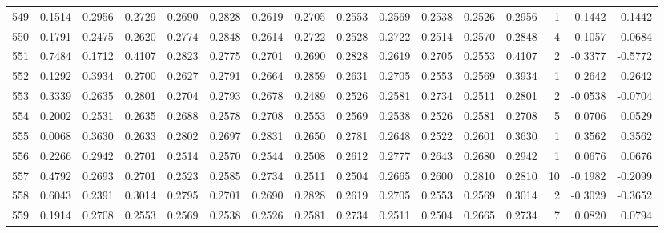 \begin{tabular}{lrrrrrrrrrrrrrrr}
549 &      0.1514 &  0.2956 &  0.2729 &  0.2690 &  0.2828 &  0.2619 &  0.2705 &  0.2553 &  0.2569 &  0.2538 &   0.2526 &     0.2956 &      1 &                    0.1442 &                     0.1442 \\
550 &      0.1791 &  0.2475 &  0.2620 &  0.2774 &  0.2848 &  0.2614 &  0.2722 &  0.2528 &  0.2722 &  0.2514 &   0.2570 &     0.2848 &      4 &                    0.1057 &                     0.0684 \\
551 &      0.7484 &  0.1712 &  0.4107 &  0.2823 &  0.2775 &  0.2701 &  0.2690 &  0.2828 &  0.2619 &  0.2705 &   0.2553 &     0.4107 &      2 &                   -0.3377 &                    -0.5772 \\
552 &      0.1292 &  0.3934 &  0.2700 &  0.2627 &  0.2791 &  0.2664 &  0.2859 &  0.2631 &  0.2705 &  0.2553 &   0.2569 &     0.3934 &      1 &                    0.2642 &                     0.2642 \\
553 &      0.3339 &  0.2635 &  0.2801 &  0.2704 &  0.2793 &  0.2678 &  0.2489 &  0.2526 &  0.2581 &  0.2734 &   0.2511 &     0.2801 &      2 &                   -0.0538 &                    -0.0704 \\
554 &      0.2002 &  0.2531 &  0.2635 &  0.2688 &  0.2578 &  0.2708 &  0.2553 &  0.2569 &  0.2538 &  0.2526 &   0.2581 &     0.2708 &      5 &                    0.0706 &                     0.0529 \\
555 &      0.0068 &  0.3630 &  0.2633 &  0.2802 &  0.2697 &  0.2831 &  0.2650 &  0.2781 &  0.2648 &  0.2522 &   0.2601 &     0.3630 &      1 &                    0.3562 &                     0.3562 \\
556 &      0.2266 &  0.2942 &  0.2701 &  0.2514 &  0.2570 &  0.2544 &  0.2508 &  0.2612 &  0.2777 &  0.2643 &   0.2680 &     0.2942 &      1 &                    0.0676 &                     0.0676 \\
557 &      0.4792 &  0.2693 &  0.2701 &  0.2523 &  0.2585 &  0.2734 &  0.2511 &  0.2504 &  0.2665 &  0.2600 &   0.2810 &     0.2810 &     10 &                   -0.1982 &                    -0.2099 \\
558 &      0.6043 &  0.2391 &  0.3014 &  0.2795 &  0.2701 &  0.2690 &  0.2828 &  0.2619 &  0.2705 &  0.2553 &   0.2569 &     0.3014 &      2 &                   -0.3029 &                    -0.3652 \\
559 &      0.1914 &  0.2708 &  0.2553 &  0.2569 &  0.2538 &  0.2526 &  0.2581 &  0.2734 &  0.2511 &  0.2504 &   0.2665 &     0.2734 &      7 &                    0.0820 &                     0.0794 \\

\end{tabular}
